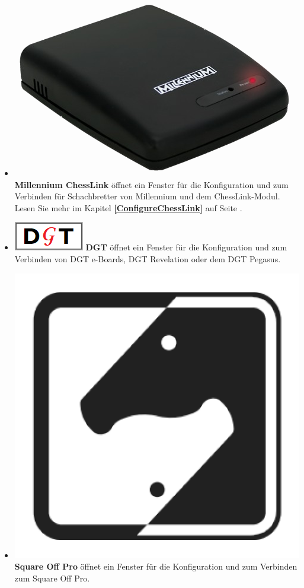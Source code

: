 \documentclass[11pt,a4paper]{article}
\begin{document}
\begin{itemize}
		\item  \includegraphics[scale=0.05]{Millennium ChessLink.png} \textbf{Millennium ChessLink} öffnet ein Fenster für die Konfiguration und zum Verbinden für Schachbretter von Millennium und dem ChessLink-Modul. Lesen Sie mehr im Kapitel \textbf{\ref{ConfigureChessLink}  } auf Seite \pageref{ConfigureChessLink}.
		\item  \includegraphics[scale=0.3]{dgt48.png} \textbf{DGT} öffnet ein Fenster für die Konfiguration und zum Verbinden von DGT e-Boards, DGT Revelation oder dem DGT Pegasus.	
		\item  \includegraphics[scale=0.05]{squareoff.png} \textbf{Square Off Pro} öffnet ein Fenster für die Konfiguration und zum Verbinden zum Square Off Pro.

\end{itemize}
\end{document}
